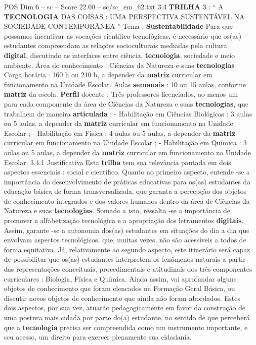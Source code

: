 \begin{textsample}{POS Dim 6 – sc – Score 22.00 – sc/sc\_em\_62.txt}  \label{ex:f6_pos_016}
3.4 \textbf{TRILHA} 3 : “ A \textbf{TECNOLOGIA} DAS COISAS : UMA PERSPECTIVA SUSTENTÁVEL NA SOCIEDADE CONTEMPORÂNEA ” Tema : \textbf{Sustentabilidade} Para que possamos incentivar as vocações científico-tecnológicas, é necessário que os(as) estudantes compreendam as relações socioculturais mediadas pela cultura \textbf{digital}, discutindo as interfaces entre ciência, \textbf{tecnologia}, sociedade e meio ambiente.
Área do conhecimento : Ciências da Natureza e suas \textbf{tecnologias} Carga horária : 160 h ou 240 h, a depender da \textbf{matriz} curricular em funcionamento na Unidade Escolar.
Aulas \textbf{semanais} : 10 ou 15 aulas, conforme \textbf{matriz} da escola. \textbf{Perfil} docente : Três professores licenciados, ao menos um para cada componente da área de Ciências da Natureza e suas \textbf{tecnologias}, que trabalhem de maneira \textbf{articulada} : - Habilitação em Ciências Biológicas : 3 aulas ou 5 aulas, a depender da \textbf{matriz} curricular em funcionamento na Unidade Escolar ; - Habilitação em Física : 4 aulas ou 5 aulas, a depender da \textbf{matriz} curricular em funcionamento na Unidade Escolar ; - Habilitação em Química : 3 aulas ou 5 aulas, a depender da \textbf{matriz} curricular em funcionamento na Unidade Escolar. 3.4.1 Justificativa Esta \textbf{trilha} tem sua relevância pautada em dois aspectos essenciais : social e científico.
Quanto ao primeiro aspecto, entende -se a importância do desenvolvimento de práticas educativas para os(as) estudantes da educação básica de forma transversalizada, que garanta a percepção dos objetos de conhecimento integrados e dos valores humanos dentro da área de Ciências da Natureza e suas \textbf{tecnologias}.
Somado a isto, ressalta -se a importância de promover a alfabetização tecnológica e a apropriação dos letramentos \textbf{digitais}.
Assim, garante -se a autonomia dos(as) estudantes em situações do dia a dia que envolvam aspectos tecnológicos, que, muitas vezes, não são acessíveis a todos de forma equitativa.
Já, relativamente ao segundo aspecto, este itinerário será capaz de possibilitar que os(as) estudantes interpretem os fenômenos naturais a partir das representações conceituais, procedimentais e atitudinais dos três componentes curriculares : Biologia, Física e Química.
Ainda assim, vai aprofundar alguns objetos de conhecimento que foram elencados na Formação Geral Básica, ou discutir novos objetos de conhecimento que ainda não foram abordados.
Estes dois aspectos, por sua vez, atuarão pedagogicamente em favor da construção de uma postura mais cidadã por parte do(a) estudante, no sentido de que perceberá que a \textbf{tecnologia} precisa ser compreendida como um instrumento importante, e seu acesso, um direito para exercer plenamente sua cidadania.

\end{textsample}
